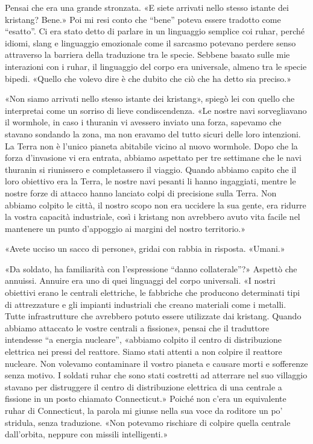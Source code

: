 Pensai che era una grande stronzata. «E siete arrivati nello stesso
istante dei kristang? Bene.» Poi mi resi conto che ``bene'' poteva
essere tradotto come ``esatto''. Ci era stato detto di parlare in un
linguaggio semplice coi ruhar, perché idiomi, slang e linguaggio
emozionale come il sarcasmo potevano perdere senso attraverso la
barriera della traduzione tra le specie. Sebbene basato sulle mie
interazioni con i ruhar, il linguaggio del corpo era universale, almeno
tra le specie bipedi. «Quello che volevo dire è che dubito che ciò che
ha detto sia preciso.»

«Non siamo arrivati nello stesso istante dei kristang», spiegò lei con
quello che interpretai come un sorriso di lieve condiscendenza. «Le
nostre navi sorvegliavano il wormhole, in caso i thuranin vi avessero
inviato una forza, sapevamo che stavano sondando la zona, ma non eravamo
del tutto sicuri delle loro intenzioni. La Terra non è l'unico pianeta
abitabile vicino al nuovo wormhole. Dopo che la forza d'invasione vi era
entrata, abbiamo aspettato per tre settimane che le navi thuranin si
riunissero e completassero il viaggio. Quando abbiamo capito che il loro
obiettivo era la Terra, le nostre navi pesanti li hanno ingaggiati,
mentre le nostre forze di attacco hanno lanciato colpi di precisione
sulla Terra. Non abbiamo colpito le città, il nostro scopo non era
uccidere la sua gente, era ridurre la vostra capacità industriale, così
i kristang non avrebbero avuto vita facile nel mantenere un punto
d'appoggio ai margini del nostro territorio.»

«Avete ucciso un sacco di persone», gridai con rabbia in risposta.
«Umani.»

«Da soldato, ha familiarità con l'espressione ``danno collaterale''?»
Aspettò che annuissi. Annuire era uno di quei linguaggi del corpo
universali. «I nostri obiettivi erano le centrali elettriche, le
fabbriche che producono determinati tipi di attrezzature e gli impianti
industriali che creano materiali come i metalli. Tutte infrastrutture
che avrebbero potuto essere utilizzate dai kristang. Quando abbiamo
attaccato le vostre centrali a fissione», pensai che il traduttore
intendesse ``a energia nucleare'', «abbiamo colpito il centro di
distribuzione elettrica nei pressi del reattore. Siamo stati attenti a
non colpire il reattore nucleare. Non volevamo contaminare il vostro
pianeta e causare morti e sofferenze senza motivo. I soldati ruhar che
sono stati costretti ad atterrare nel suo villaggio stavano per
distruggere il centro di distribuzione elettrica di una centrale a
fissione in un posto chiamato Connecticut.» Poiché non c'era un
equivalente ruhar di Connecticut, la parola mi giunse nella sua voce da
roditore un po' stridula, senza traduzione. «Non potevamo rischiare di
colpire quella centrale dall'orbita, neppure con missili intelligenti.»


